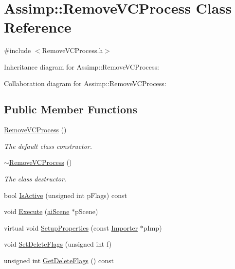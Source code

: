 \hypertarget{class_assimp_1_1_remove_v_c_process}{\section{Assimp\+:\+:Remove\+V\+C\+Process Class Reference}
\label{class_assimp_1_1_remove_v_c_process}
}


{\ttfamily \#include $<$Remove\+V\+C\+Process.\+h$>$}



Inheritance diagram for Assimp\+:\+:Remove\+V\+C\+Process\+:


Collaboration diagram for Assimp\+:\+:Remove\+V\+C\+Process\+:
\subsection*{Public Member Functions}
\begin{DoxyCompactItemize}
\item 
\hypertarget{class_assimp_1_1_remove_v_c_process_a107fcc50385ec046d56f43354f500b4b}{\hyperlink{class_assimp_1_1_remove_v_c_process_a107fcc50385ec046d56f43354f500b4b}{Remove\+V\+C\+Process} ()}\label{class_assimp_1_1_remove_v_c_process_a107fcc50385ec046d56f43354f500b4b}

\begin{DoxyCompactList}\small\item\em The default class constructor. \end{DoxyCompactList}\item 
\hypertarget{class_assimp_1_1_remove_v_c_process_afb27415a32b626de78c1fbc612dcb09b}{\hyperlink{class_assimp_1_1_remove_v_c_process_afb27415a32b626de78c1fbc612dcb09b}{$\sim$\+Remove\+V\+C\+Process} ()}\label{class_assimp_1_1_remove_v_c_process_afb27415a32b626de78c1fbc612dcb09b}

\begin{DoxyCompactList}\small\item\em The class destructor. \end{DoxyCompactList}\item 
bool \hyperlink{class_assimp_1_1_remove_v_c_process_a018e5281f623b975b5fc7e41486fba07}{Is\+Active} (unsigned int p\+Flags) const 
\item 
void \hyperlink{class_assimp_1_1_remove_v_c_process_a333336fa48d30dfa5fedb6b71166088a}{Execute} (\hyperlink{structai_scene}{ai\+Scene} $\ast$p\+Scene)
\item 
virtual void \hyperlink{class_assimp_1_1_remove_v_c_process_a904f6b1717e6826090ee041c4cb0db0d}{Setup\+Properties} (const \hyperlink{class_assimp_1_1_importer}{Importer} $\ast$p\+Imp)
\item 
void \hyperlink{class_assimp_1_1_remove_v_c_process_a3e949e35dd21480d1361603726adb01d}{Set\+Delete\+Flags} (unsigned int f)
\item 
unsigned int \hyperlink{class_assimp_1_1_remove_v_c_process_a72b032ea14dcdcd6e6103eff2a9cf0d9}{Get\+Delete\+Flags} () const 
\end{DoxyCompactItemize}
